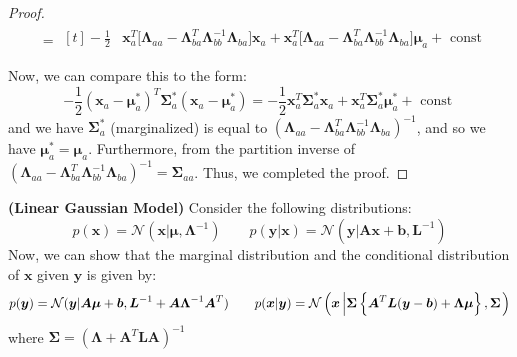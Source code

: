 \begin{proof}
\begin{equation*}
\begin{aligned}
        &= \begin{aligned}[t]
           -\frac{1}{2}&\boldsymbol x_a^T\Big[\boldsymbol \Lambda_{aa} - \boldsymbol \Lambda_{ba}^T\boldsymbol\Lambda_{bb}^{-1}\boldsymbol \Lambda_{ba}\Big]\boldsymbol x_a + \boldsymbol x_a^T\Big[\boldsymbol \Lambda_{aa}-\boldsymbol \Lambda_{ba}^T\boldsymbol\Lambda_{bb}^{-1}\boldsymbol \Lambda_{ba} \Big]\boldsymbol \mu_a+ \text{ const } \\
        \end{aligned} \\ 
    \end{aligned}
    \end{equation*}
    Now, we can compare this to the form:
    \begin{equation*}
        -\frac{1}{2}(\boldsymbol x_a - \boldsymbol \mu_{a}^*)^T\boldsymbol \Sigma^{*}_a(\boldsymbol x_a - \boldsymbol \mu_a^*) = -\frac{1}{2}\boldsymbol x_a^T\boldsymbol \Sigma^*_a\boldsymbol x_a + \boldsymbol x_a^T\boldsymbol \Sigma_a^*\boldsymbol \mu_a^* + \text{ const }
    \end{equation*}
    and we have $\boldsymbol \Sigma^*_a$ (marginalized) is equal to $(\boldsymbol \Lambda_{aa}-\boldsymbol \Lambda_{ba}^T\boldsymbol\Lambda_{bb}^{-1}\boldsymbol \Lambda_{ba})^{-1}$, and so we have $\boldsymbol \mu^*_a = \boldsymbol \mu_a$. Furthermore, from the partition inverse of $(\boldsymbol \Lambda_{aa}-\boldsymbol \Lambda_{ba}^T\boldsymbol\Lambda_{bb}^{-1}\boldsymbol \Lambda_{ba})^{-1} = \boldsymbol \Sigma_{aa}$. Thus, we completed the proof.
\end{proof}

\begin{proposition}{\textbf{(Linear Gaussian Model)}}
    Consider the following distributions:
    \begin{equation*}
        p(\boldsymbol x) = \mathcal{N}(\boldsymbol x | \boldsymbol \mu, \boldsymbol \Lambda^{-1}) \qquad p(\boldsymbol y|\boldsymbol x) = \mathcal{N}(\boldsymbol y | \boldsymbol A\boldsymbol x + \boldsymbol b, \boldsymbol L^{-1})
    \end{equation*}
    Now, we can show that the marginal distribution and the conditional distribution of $\boldsymbol x$ given $\boldsymbol y$ is given by:
    \begin{equation*}
        p(\boldsymbol y) = \mathcal{N}(\boldsymbol y |\boldsymbol A\boldsymbol \mu + \boldsymbol b, \boldsymbol L^{-1} + \boldsymbol A\boldsymbol \Lambda^{-1}\boldsymbol A^T) \qquad p(\boldsymbol x | \boldsymbol y) = \mathcal{N}\left( \boldsymbol x \left| \boldsymbol \Sigma\left\{ \boldsymbol A^T\boldsymbol L(\boldsymbol y - \boldsymbol b) + \boldsymbol \Lambda\boldsymbol \mu \right\}, \boldsymbol \Sigma\right. \right)
    \end{equation*}
    where $\boldsymbol \Sigma = (\boldsymbol \Lambda + \boldsymbol A^T\boldsymbol L\boldsymbol A)^{-1}$
\end{proposition}

